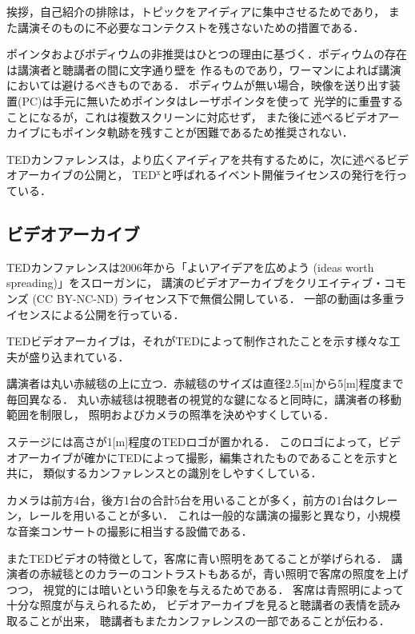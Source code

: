 \documentclass[submit,techreq,jkeyword,noauthor]{ipsj}
\newcommand{\TED}{\textrm{TED}}
\newcommand{\TEDx}{\TED${}^{\textrm{x}}$}
\begin{document}
挨拶，自己紹介の排除は，トピックをアイディアに集中させるためであり，
また講演そのものに不必要なコンテクストを残さないための措置である．

ポインタおよびポディウムの非推奨はひとつの理由に基づく．ポディウムの存在は講演者と聴講者の間に文字通り壁を
作るものであり，ワーマンによれば講演においては避けるべきものである．
ポディウムが無い場合，映像を送り出す装置(PC)は手元に無いためポインタはレーザポインタを使って
光学的に重畳することになるが，これは複数スクリーンに対応せず，
また後に述べるビデオアーカイブにもポインタ軌跡を残すことが困難であるため推奨されない．


\TED カンファレンスは，より広くアイディアを共有するために，次に述べるビデオアーカイブの公開と，
\TEDx と呼ばれるイベント開催ライセンスの発行を行っている．

\subsection{ビデオアーカイブ}

\TED カンファレンスは2006年から「よいアイデアを広めよう (ideas worth spreading)」をスローガンに，
講演のビデオアーカイブをクリエイティブ・コモンズ (CC BY-NC-ND) ライセンス下で無償公開している．
一部の動画は多重ライセンスによる公開を行っている．

\TED ビデオアーカイブは，それが\TED によって制作されたことを示す様々な工夫が盛り込まれている．

講演者は丸い赤絨毯の上に立つ．赤絨毯のサイズは直径2.5[m]から5[m]程度まで毎回異なる．
丸い赤絨毯は視聴者の視覚的な鍵になると同時に，講演者の移動範囲を制限し，
照明およびカメラの照準を決めやすくしている．

ステージには高さが1[m]程度の\TED ロゴが置かれる．
このロゴによって，ビデオアーカイブが確かに\TED によって撮影，編集されたものであることを示すと共に，
類似するカンファレンスとの識別をしやすくしている．

カメラは前方4台，後方1台の合計5台を用いることが多く，前方の1台はクレーン，レールを用いることが多い．
これは一般的な講演の撮影と異なり，小規模な音楽コンサートの撮影に相当する設備である．

また\TED ビデオの特徴として，客席に青い照明をあてることが挙げられる．
講演者の赤絨毯とのカラーのコントラストもあるが，青い照明で客席の照度を上げつつ，
視覚的には暗いという印象を与えるためである．
客席は青照明によって十分な照度が与えられるため，
ビデオアーカイブを見ると聴講者の表情を読み取ることが出来，
聴講者もまたカンファレンスの一部であることが伝わる．
\end{document}
